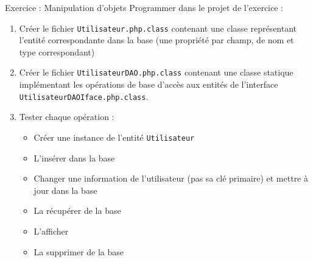 \begin{frame}[containsverbatim]{Exercice  : Manipulation d’objets}
	Programmer dans le projet de l’exercice  :
	\begin{enumerate}
		\item Créer le fichier \texttt{Utilisateur.php.class} contenant une classe représentant l’entité correspondante dans la base (une propriété par champ, de nom et type correspondant)
		\item Créer le fichier \texttt{UtilisateurDAO.php.class} contenant une classe statique implémentant les opérations de base d’accès aux entités de l’interface \texttt{UtilisateurDAOIface.php.class}.
		\item Tester chaque opération :
		\begin{itemize}
			\item Créer une instance de l’entité \texttt{Utilisateur}
			\item L’insérer dans la base
			\item Changer une information de l’utilisateur (pas sa clé primaire) et mettre à jour dans la base
			\item La récupérer de la base
			\item L’afficher
			\item La supprimer de la base
		\end{itemize}
	\end{enumerate}
\end{frame}
 
